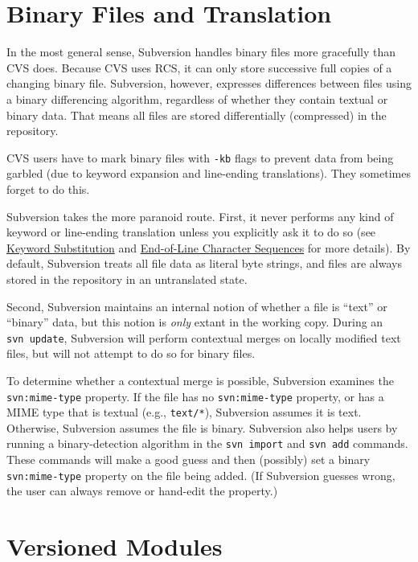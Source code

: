 \section{Binary Files and
Translation}\label{svn.forcvs.binary-and-trans}

In the most general sense, Subversion handles binary files more
gracefully than CVS does. Because CVS uses RCS, it can only store
successive full copies of a changing binary file. Subversion, however,
expresses differences between files using a binary differencing
algorithm, regardless of whether they contain textual or binary data.
That means all files are stored differentially (compressed) in the
repository.

CVS users have to mark binary files with \texttt{-kb} flags to prevent
data from being garbled (due to keyword expansion and line-ending
translations). They sometimes forget to do this.

Subversion takes the more paranoid route. First, it never performs any
kind of keyword or line-ending translation unless you explicitly ask it
to do so (see \hyperref[svn.advanced.props.special.keywords]{Keyword
Substitution} and
\hyperref[svn.advanced.props.special.eol-style]{End-of-Line Character
Sequences} for more details). By default, Subversion treats all file
data as literal byte strings, and files are always stored in the
repository in an untranslated state.

Second, Subversion maintains an internal notion of whether a file is
``text'' or ``binary'' data, but this notion is \emph{only} extant in
the working copy. During an \texttt{svn\ update}, Subversion will
perform contextual merges on locally modified text files, but will not
attempt to do so for binary files.

To determine whether a contextual merge is possible, Subversion examines
the \texttt{svn:mime-type} property. If the file has no
\texttt{svn:mime-type} property, or has a MIME type that is textual
(e.g., \texttt{text/*}), Subversion assumes it is text. Otherwise,
Subversion assumes the file is binary. Subversion also helps users by
running a binary-detection algorithm in the \texttt{svn\ import} and
\texttt{svn\ add} commands. These commands will make a good guess and
then (possibly) set a binary \texttt{svn:mime-type} property on the file
being added. (If Subversion guesses wrong, the user can always remove or
hand-edit the property.)

\section{Versioned Modules}\label{svn.forcvs.modules}

